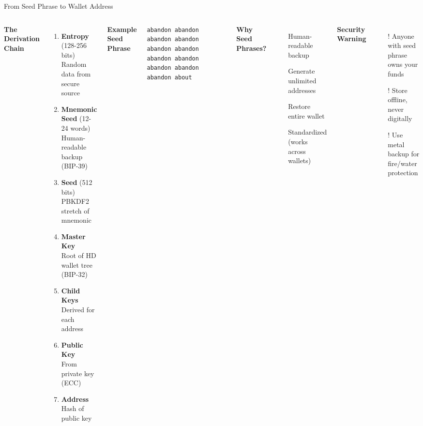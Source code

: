 \documentclass[8pt,aspectratio=169]{beamer}
\begin{document}
\begin{frame}[t]{From Seed Phrase to Wallet Address}
\begin{columns}[T]
\textbf{The Derivation Chain}

\begin{enumerate}
\item \textbf{Entropy} (128-256 bits)\\
      Random data from secure source
\item \textbf{Mnemonic Seed} (12-24 words)\\
      Human-readable backup (BIP-39)
\item \textbf{Seed} (512 bits)\\
      PBKDF2 stretch of mnemonic
\item \textbf{Master Key}\\
      Root of HD wallet tree (BIP-32)
\item \textbf{Child Keys}\\
      Derived for each address
\item \textbf{Public Key}\\
      From private key (ECC)
\item \textbf{Address}\\
      Hash of public key
\end{enumerate}

\textbf{Example Seed Phrase}

\footnotesize
\texttt{abandon abandon abandon abandon abandon abandon abandon abandon abandon abandon abandon about}
\normalsize

\vspace{0.5em}
\textbf{Why Seed Phrases?}
\begin{itemize}
\item[\textcolor{mlgreen}{\checkmark}] Human-readable backup
\item[\textcolor{mlgreen}{\checkmark}] Generate unlimited addresses
\item[\textcolor{mlgreen}{\checkmark}] Restore entire wallet
\item[\textcolor{mlgreen}{\checkmark}] Standardized (works across wallets)
\end{itemize}

\vspace{0.5em}
\textbf{Security Warning}
\begin{itemize}
\item[\textcolor{mlred}{!}] Anyone with seed phrase owns your funds
\item[\textcolor{mlred}{!}] Store offline, never digitally
\item[\textcolor{mlred}{!}] Use metal backup for fire/water protection
\end{itemize}
\end{columns}
\end{frame}
\end{document}
